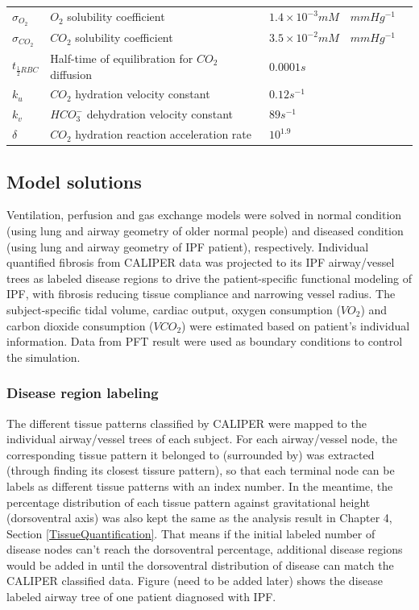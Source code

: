 \begin{landscape}
\begin{table}[htbp]
\begin{tabular}{p{2.2cm} p{7.5cm} p{5.2cm} p{4.8cm}}
$\sigma_{O_2}$ & $O_2$ solubility coefficient & $1.4 \times 10^{-3}mM \quad mmHg^{-1}$ & \cite{keener1998mathematical} \\
$\sigma_{CO_2}$ & $CO_2$ solubility coefficient & $3.5 \times 10^{-2}mM \quad mmHg^{-1}$ & \cite{keener1998mathematical} \\
$t_{\frac{1}{2}RBC}$ & Half-time of equilibration for $CO_2$ diffusion & $0.0001 s$ & \cite{hill1973mathematical} \\
$k_u$ & $CO_2$ hydration velocity constant & $0.12s^{-1}$ & \cite{hill1973mathematical} \\
$k_v$ & $HCO^{-}_3$ dehydration velocity constant & $89s^{-1}$ & \cite{hill1973mathematical} \\
$\delta$ & $CO_2$ hydration reaction acceleration rate & $10^{1.9}$ & \cite{ben2006simplified} \\
\hline
\end{tabular}
\end{table}
\end{landscape}
\restoregeometry

\subsection{Model solutions}
Ventilation, perfusion and gas exchange models were solved in normal condition (using lung and airway geometry of older normal people) and diseased condition (using lung and airway geometry of IPF patient), respectively. Individual quantified fibrosis from CALIPER data was projected to its IPF airway/vessel trees as labeled disease regions to drive the patient-specific functional modeling of IPF, with fibrosis reducing tissue compliance and narrowing vessel radius. The subject-specific tidal volume, cardiac output, oxygen consumption ($VO_2$) and carbon dioxide consumption ($VCO_2$) were estimated based on patient's individual information. Data from PFT result were used as boundary conditions to control the simulation.

\subsubsection{Disease region labeling}
The different tissue patterns classified by CALIPER were mapped to the individual airway/vessel trees of each subject. For each airway/vessel node, the corresponding tissue pattern it belonged to (surrounded by) was extracted (through finding its closest tissure pattern), so that each terminal node can be labels as different tissue patterns with an index number. In the meantime, the percentage distribution of each tissue pattern against gravitational height (dorsoventral axis) was also kept the same as the analysis result in Chapter 4, Section \ref{TissueQuantification}. That means if the initial labeled number of disease nodes can't reach the dorsoventral percentage, additional disease regions would be added in until the dorsoventral distribution of disease can match the CALIPER classified data. Figure (need to be added later) shows the disease labeled airway tree of one patient diagnosed with IPF.

